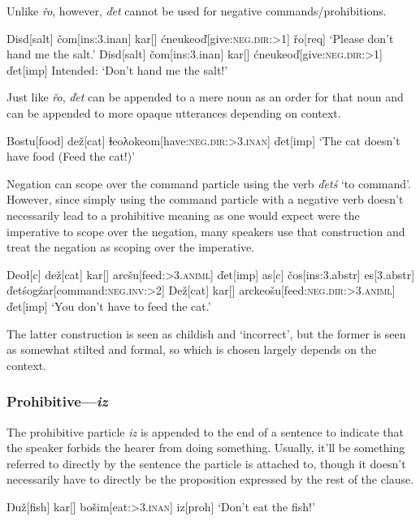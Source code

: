 \documentclass[10pt]{article}
\newcommand{\sk}{\textsc}
\newcommand{\vd}{ď}
\newcommand{\vc}{č}
\newcommand{\vz}{ž}
\newcommand{\vs}{š}
\newcommand{\vr}{ř}
\newcommand{\Engma}{Ŋ}
\newcommand{\dbl}{ⱡ}
\newcommand{\lam}{λ}
\begin{document}
Unlike \textit{\vr o}, however, \textit{\vd et} cannot be used for negative commands/prohibitions.

\pex 
\a 
\begingl
Disd[salt]
\vc om[\sc ins:3.inan]
kar[]
\'cneukeo\vd[give:\sk{neg.dir:>1}]
\vr o[\sc req]
\glft `Please don't hand me the salt.'
\endgl
\a \ljudge{\#}
\begingl
Disd[salt]
\vc om[\sc ins:3.inan]
kar[]
\'cneukeo\vd[give:\sk{neg.dir:>1}]
\vd et[\sc imp]
\glft Intended: `Don't hand me the salt!'
\endgl
\xe

Just like \textit{\vr o}, \textit{\vd et} can be appended to a mere noun as an order for that noun and can be appended to more opaque utterances depending on context. 

\ex 
\begingl
Bostu[food]
de\vz[cat]
\dbl eo\lam okeom[have:\sk{neg.dir:>3.inan}]
\vd et[\sc imp]
\glft `The cat doesn't have food (Feed the cat!)'
\endgl
\xe

Negation can scope over the command particle using the verb \textit{\vd et\'s} `to command'. However, since simply using the command particle with a negative verb doesn't necessarily lead to a prohibitive meaning as one would expect were the imperative to scope over the negation, many speakers use that construction and treat the negation as scoping over the imperative.

\pex
\a 
\begingl
Deo\l[\sc c]
de\vz[cat]
kar[]
arc\vs u[feed:\sk{>3.animl}]
\vd et[\sc imp]
\nogloss{,}
as[\sc c]
\vc os[\sc ins:3.abstr]
es[\sc 3.abstr]
\vd et\'sog\'zar[command:\sk{neg.inv:>2}]
\endgl
\a {}
\begingl
De\vz[cat]
kar[]
arckeo\vs u[feed:\sk{neg.dir:>3.animl}]
\vd et[\sc imp]
\glft `You don't have to feed the cat.'
\endgl
\xe 

The latter construction is seen as childish and `incorrect', but the former is seen as somewhat stilted and formal, so which is chosen largely depends on the context.

\subsubsection{Prohibitive---\textit{iz}}

The prohibitive particle \textit{iz} is appended to the end of a sentence to indicate that the speaker forbids the hearer from doing something. Usually, it'll be something referred to directly by the sentence the particle is attached to, though it doesn't necessarily have to directly be the proposition expressed by the rest of the clause.

\ex 
\begingl
\Engma u\vz[fish]
kar[]
bo\vs im[eat:\sk{>3.inan}]
iz[\sc proh]
\glft `Don't eat the fish!'
\endgl
\xe 
\end{document}
